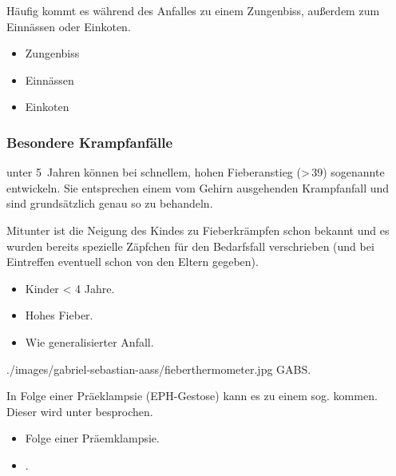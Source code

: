 {%
Häufig kommt es während des Anfalles zu einem Zungenbiss,
außerdem zum Einnässen oder Einkoten.
}{
\begin{itemize}
  \item Zungenbiss
  \item Einnässen
  \item Einkoten
\end{itemize}
}{}{}{}



\subsubsection{Besondere Krampfanfälle}

{%
\label{topic:fieberkrampf}
%
 unter 5~Jahren können bei schnellem, hohen Fieberanstieg
({\textgreater}\,39{\textcelsius}) sogenannte 
entwickeln. Sie entsprechen einem vom Gehirn ausgehenden Krampfanfall und sind grundsätzlich
genau so zu behandeln. 

Mitunter ist die Neigung des Kindes zu Fieberkrämpfen schon bekannt und es
wurden bereits spezielle Zäpfchen für den Bedarfsfall verschrieben (und bei
Eintreffen eventuell schon von den Eltern gegeben). 
}{
\begin{itemize}
  \item Kinder {\textless} 4 Jahre.
  \item Hohes Fieber.
  \item Wie generalisierter Anfall.
\end{itemize}
}
{./images/gabriel-sebastian-aass/fieberthermometer.jpg}
{}
{GABS.}



{%
In Folge einer Präeklampsie (EPH-Gestose)
kann es zu einem sog. 
kommen. Dieser wird unter 
besprochen.
}{
\begin{itemize}
    \item Folge einer Präemklampsie.
    \item {}.
\end{itemize}
}{}{}{}


